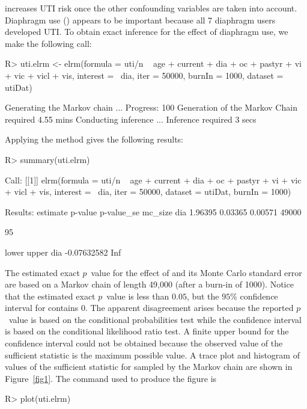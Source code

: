 \documentclass[article, shortnames]{jss}
\begin{document}
increases UTI risk once the other confounding variables are taken
into account. Diaphragm use () appears to be important
because all 7 diaphragm users developed UTI. To obtain exact
inference for the effect of diaphragm use, we make the following
call:
\begin{CodeChunk}
\begin{CodeInput}
R> uti.elrm <- elrm(formula = uti/n ~ age + current + dia + oc +
pastyr + vi + vic + vicl + vis, interest = ~dia, iter = 50000,
burnIn = 1000, dataset = utiDat)
\end{CodeInput}
\begin{CodeOutput}
Generating the Markov chain ...
Progress: 100%
Generation of the Markov Chain required 4.55 mins
Conducting inference ...
Inference required 3 secs
\end{CodeOutput}
\end{CodeChunk}

Applying the  method gives the following results:
\begin{CodeChunk}
\begin{CodeInput}
R> summary(uti.elrm)
\end{CodeInput}
\begin{CodeOutput}
Call:
[[1]]
elrm(formula = uti/n ~ age + current + dia + oc + pastyr + vi + vic + vicl
     + vis, interest = ~dia, iter = 50000, dataset = utiDat, burnIn = 1000)

Results:
    estimate p-value p-value_se mc_size
dia  1.96395 0.03365    0.00571   49000

95%

          lower upper
dia -0.07632582   Inf
\end{CodeOutput}
\end{CodeChunk}
The estimated exact $p$~value for the effect of  and its
Monte Carlo standard error are based on a Markov chain of length
49,000 (after a burn-in of 1000). Notice that the estimated exact
$p$~value is less than $0.05$, but the $95\%$ confidence interval
for  contains $0$. The apparent disagreement arises
because the reported $p$~value is based on the conditional
probabilities test while the confidence interval is based on the
conditional likelihood ratio test. A finite upper bound for the
confidence interval could not be obtained because the observed
value of the sufficient statistic is the maximum possible value. A
trace plot and histogram of values of the sufficient statistic for
 sampled by the Markov chain are shown in Figure~\ref{fig1}.
The command used to produce the figure is
\begin{CodeChunk}
\begin{CodeInput}
R> plot(uti.elrm)
\end{CodeInput}
\end{CodeChunk}
\end{document}
